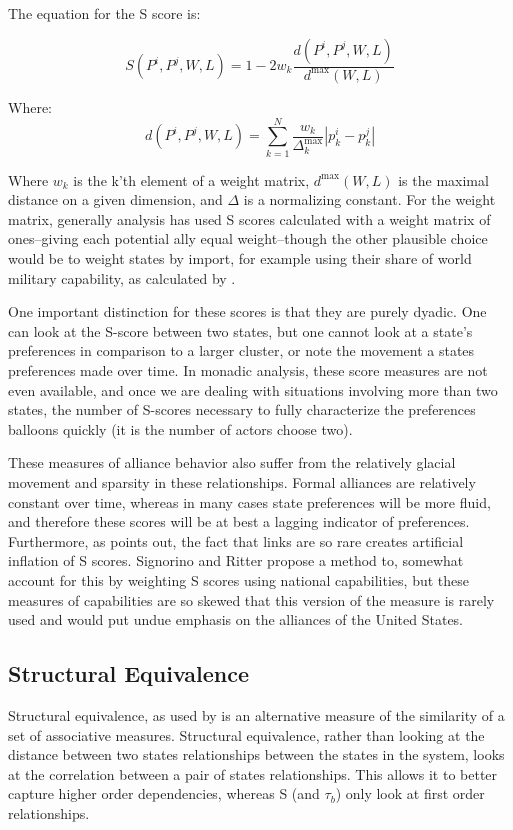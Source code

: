\documentclass[12pt,onesided,fullpage]{amsart}
\begin{document}
The equation for the S score is:

\begin{equation}
S(P^i, P^j, W, L) = 1 - 2w_k \frac{d(P^i, P^j, W, L)}{d^{\text{max}}(W,L)}
\end{equation}

Where:
\begin{equation}
d(P^i, P^j, W, L) = \sum_{k = 1}^N \frac{w_k}{\Delta^\text{max}_{k}} |p^i_k - p^j_k|
\end{equation}

Where $w_k$ is the k'th element of a weight matrix, $d^\text{max}(W,L)$ is the maximal distance on a given dimension, and $\Delta$ is a normalizing constant. For the weight matrix, generally analysis has used S scores calculated with a weight matrix of ones--giving each potential ally equal weight--though the other plausible choice would be to weight states by import, for example using their share of world military capability, as calculated by \citet{cinc}.

One important distinction for these scores is that they are purely dyadic. One can look at the S-score between two states, but one cannot look at a state's preferences in comparison to a larger cluster, or note the movement a states preferences made over time. In monadic analysis, these score measures are not even available, and once we are dealing with situations involving more than two states, the number of S-scores necessary to fully characterize the preferences balloons quickly (it is the number of actors choose two).

These measures of alliance behavior also suffer from the relatively glacial movement and sparsity in these relationships. Formal alliances are relatively constant over time, whereas in many cases state preferences will be more fluid, and therefore these scores will be at best a lagging indicator of preferences. Furthermore, as \citet{hage:2011} points out, the fact that links are so rare creates artificial inflation of S scores. Signorino and Ritter propose a method to, somewhat account for this by weighting S scores using national capabilities, but these measures of capabilities are so skewed that this version of the measure is rarely used and would put undue emphasis on the alliances of the United States.

\subsection{Structural Equivalence}
Structural equivalence, as used by \citet{maoz:etal:2006} is an alternative measure of the similarity of a set of associative measures. Structural equivalence, rather than looking at the distance between two states relationships between the states in the system, looks at the correlation between a pair of states relationships. This allows it to better capture higher order dependencies, whereas S (and $\tau_b$) only look at first order relationships.
\end{document}
